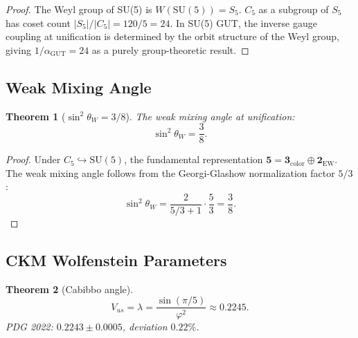 \documentclass[11pt,a4paper]{article}
\newtheorem{theorem}{Theorem}
\begin{document}
\begin{proof}
The Weyl group of SU(5) is $W(\text{SU}(5)) = S_5$. $C_5$ as a subgroup of $S_5$ has coset count $|S_5|/|C_5| = 120/5 = 24$. In SU(5) GUT, the inverse gauge coupling at unification is determined by the orbit structure of the Weyl group, giving $1/\alpha_{\text{GUT}} = 24$ as a purely group-theoretic result.
\end{proof}

\subsection{Weak Mixing Angle}

\begin{theorem}[$\sin^2\theta_W = 3/8$]
\label{thm:sw}
The weak mixing angle at unification:
\[
\sin^2\theta_W = \frac{3}{8}.
\]
\end{theorem}

\begin{proof}
Under $C_5 \hookrightarrow \text{SU}(5)$, the fundamental representation $\mathbf{5} = \mathbf{3}_{\text{color}} \oplus \mathbf{2}_{\text{EW}}$. The weak mixing angle follows from the Georgi-Glashow normalization factor $5/3$:
\[
\sin^2\theta_W = \frac{2}{5/3 + 1} \cdot \frac{5}{3} = \frac{3}{8}.
\]
\end{proof}

\subsection{CKM Wolfenstein Parameters}

\begin{theorem}[Cabibbo angle]
\label{thm:lambda}
\[
V_{us} = \lambda = \frac{\sin(\pi/5)}{\varphi^2} \approx 0.2245.
\]
PDG 2022: $0.2243 \pm 0.0005$, deviation $0.22\%$.
\end{theorem}
\end{document}

